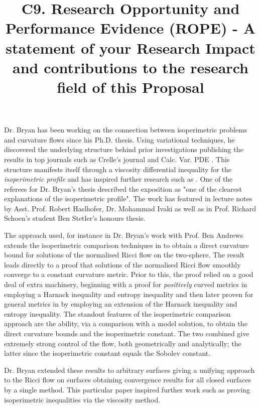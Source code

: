 \documentclass[12pt]{amsart}
\date{}
\author{}
\title{C9. Research Opportunity and Performance Evidence (ROPE) - A statement of your Research Impact and contributions to the research field of this Proposal}
\begin{document}
\maketitle

Dr. Bryan has been working on the connection between isoperimetric problems and curvature flows since his Ph.D. thesis. Using variational techniques, he discovered the underlying structure behind prior investigations \cite{MR1369140,MR1369139,MR1656553} publishing the results in top journals such as Crelle's journal and Calc. Var. PDE \cite{MR2729306,MR2794630,MR2843240,Bryan}. This structure manifests itself through a viscosity differential inequality for the \emph{isoperimetric profile} and has inspired further research such as \cite{MR3544942, MR3570462}. One of the referees for Dr. Bryan's thesis described the exposition as "one of the clearest explanations of the isoperimetric profile". The work has featured in lecture notes by Asst. Prof. Robert Haslhofer, Dr. Mohammad Ivaki as well as in Prof. Richard Schoen's student Ben Stetler's honours thesis.

The approach used, for instance in Dr. Bryan's work with Prof. Ben Andrews \cite{MR2729306} extends the isoperimetric comparison techniques in \cite{MR1369140,MR1369139} to obtain a direct curvature bound for solutions of the normalised Ricci flow on the two-sphere. The result leads directly to a proof that solutions of the normalised Ricci flow smoothly converge to a constant curvature metric. Prior to this, the proof relied on a good deal of extra machinery, beginning with a proof for \emph{positively} curved metrics in \cite{MR954419} employing a Harnack inequality and entropy inequality and then later proven for general metrics in \cite{MR1094458} by employing an extension of the Harnack inequality and entropy inequality. The standout features of the isoperimetric comparison approach are the ability, via a comparison with a model solution, to obtain the direct curvature bounds and the isoperimetric constant. The two combined give extremely strong control of the flow, both geometrically and analytically; the latter since the isoperimetric constant equals the Sobolev constant.

Dr. Bryan extended these results to arbitrary surfaces \cite{Bryan} giving a unifying approach to the Ricci flow on surfaces obtaining convergence results for all closed surfaces by a single method. This particular paper inspired further work such as \cite{MR3544942} proving isoperimetric inequalities via the viscosity method.
\end{document}

